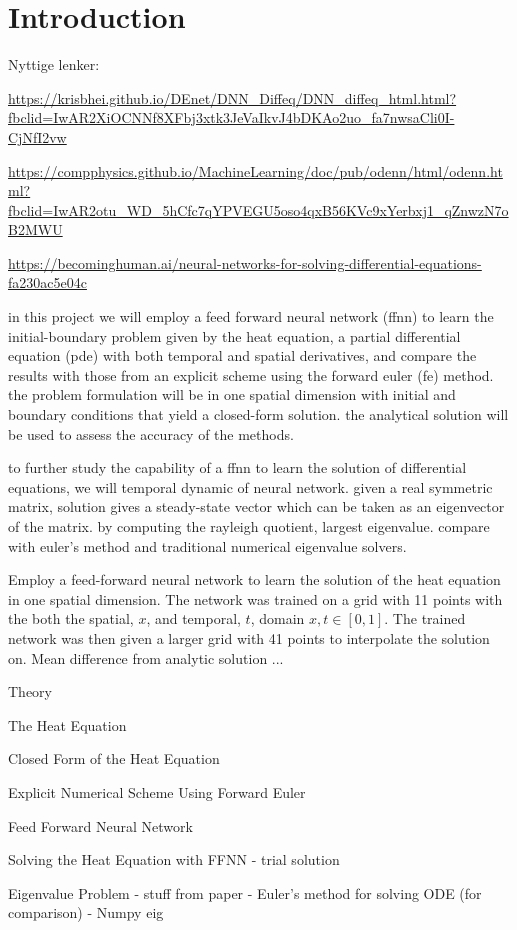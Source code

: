 \section{Introduction}\label{sec:Introduction}

Nyttige lenker:

\url{https://krisbhei.github.io/DEnet/DNN_Diffeq/DNN_diffeq_html.html?fbclid=IwAR2XiOCNNf8XFbj3xtk3JeVaIkvJ4bDKAo2uo_fa7nwsaCli0I-CjNfI2vw}

\url{https://compphysics.github.io/MachineLearning/doc/pub/odenn/html/odenn.html?fbclid=IwAR2otu_WD_5hCfc7qYPVEGU5oso4qxB56KVc9xYerbxj1_qZnwzN7oB2MWU}

\url{https://becominghuman.ai/neural-networks-for-solving-differential-equations-fa230ac5e04c} 

in this project we will employ a feed forward neural network (ffnn) to learn the initial-boundary problem given by the heat equation, a partial differential equation (pde) with both temporal and spatial derivatives, and compare the results with those from an explicit scheme using the forward euler (fe) method. the problem formulation will be in one spatial dimension with initial and boundary conditions that yield a closed-form solution. the analytical solution will be used to assess the accuracy of the methods. 

to further study the capability of a ffnn to learn the solution of differential equations, we will 
temporal dynamic of neural network. given a real symmetric matrix, solution gives a steady-state vector which can be taken as an eigenvector of the matrix. by computing the rayleigh quotient, largest eigenvalue.
compare with euler's method and traditional numerical eigenvalue solvers.


Employ a feed-forward neural network to learn the solution of the heat equation in one spatial dimension. The network was trained on a grid with 11 points with the both the spatial, $x$, and temporal, $t$, domain $x, t \in [0,1]$. The trained network was then given a larger grid with 41 points to interpolate the solution on. Mean difference from analytic solution ...

Theory

The Heat Equation 

Closed Form of the Heat Equation

Explicit Numerical Scheme Using Forward Euler

Feed Forward Neural Network

Solving the Heat Equation with FFNN 
- trial solution

Eigenvalue Problem
- stuff from paper
- Euler's method for solving ODE (for comparison)
- Numpy eig
